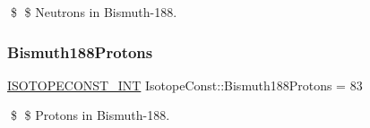 \$ \$ Neutrons in Bismuth-\/188. \mbox{\label{group___isotope_const-_bismuth-_bi188_ga313d3435b1f1ccb98b038189caf70ef3}} 
\subsubsection{\texorpdfstring{Bismuth188\+Protons}{Bismuth188Protons}}
{\footnotesize\ttfamily \mbox{\hyperlink{group___isotope_const-_macros_ga5f18360b3e99483a35c32d789e62621c}{I\+S\+O\+T\+O\+P\+E\+C\+O\+N\+S\+T\+\_\+\+I\+NT}} Isotope\+Const\+::\+Bismuth188\+Protons = 83}

\$ \$ Protons in Bismuth-\/188. 